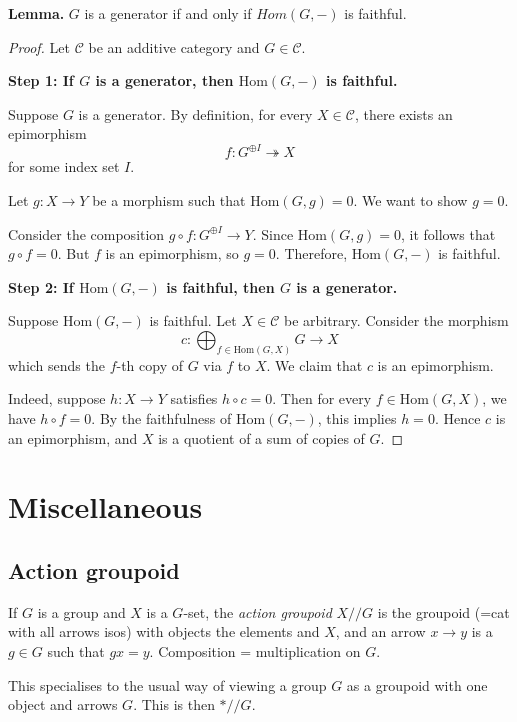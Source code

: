 \documentclass[11pt]{article}
\theoremstyle{definition}
\begin{document}
\noindent \textbf{Lemma.} $G$ is a generator if and only if $Hom(G,-)$ is faithful.

\begin{proof}
Let $\mathcal C$ be an additive category and $G \in \mathcal C$.

\textbf{Step 1: If $G$ is a generator, then $\mathrm{Hom}(G,-)$ is faithful.}

Suppose $G$ is a generator. By definition, for every $X \in \mathcal C$, there exists an epimorphism
\[
f: G^{\oplus I} \twoheadrightarrow X
\]
for some index set $I$.

Let $g: X \to Y$ be a morphism such that $\mathrm{Hom}(G,g) = 0$. We want to show $g=0$.

Consider the composition $g \circ f: G^{\oplus I} \to Y$. Since $\mathrm{Hom}(G,g)=0$, it follows that $g \circ f = 0$. But $f$ is an epimorphism, so $g=0$. Therefore, $\mathrm{Hom}(G,-)$ is faithful.

\textbf{Step 2: If $\mathrm{Hom}(G,-)$ is faithful, then $G$ is a generator.}

Suppose $\mathrm{Hom}(G,-)$ is faithful. Let $X \in \mathcal C$ be arbitrary. Consider the morphism
\[
c: \bigoplus_{f \in \mathrm{Hom}(G,X)} G \longrightarrow X
\]
which sends the $f$-th copy of $G$ via $f$ to $X$. We claim that $c$ is an epimorphism.

Indeed, suppose $h: X \to Y$ satisfies $h \circ c = 0$. Then for every $f \in \mathrm{Hom}(G,X)$, we have $h \circ f = 0$. By the faithfulness of $\mathrm{Hom}(G,-)$, this implies $h=0$. Hence $c$ is an epimorphism, and $X$ is a quotient of a sum of copies of $G$.
\end{proof}
 


\section{Miscellaneous}

\subsection{Action groupoid}

If $G$ is a group and $X$ is a $G$-set, the \textit{action groupoid} $X /\!\!/ G$ is the groupoid (=cat with all arrows isos) with objects the elements and $X$, and an arrow $x \to y$ is a $g \in G$ such that $gx=y$. Composition = multiplication on $G$.

This specialises to the usual way of viewing a group $G$ as a groupoid with one object and arrows $G$. This is then $* /\!\!/ G$.
\end{document}
